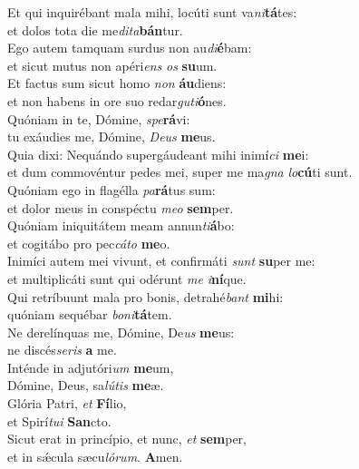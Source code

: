 \oddverse Et qui inquirébant mala mihi, locúti sunt va\textit{ni}\textbf{tá}tes:~\*\\
\oddverse et dolos tota die me\textit{di}\textit{ta}\textbf{bán}tur.\\
\evenverse Ego autem tamquam surdus non au\textit{di}\textbf{é}bam:~\*\\
\evenverse et sicut mutus non apéri\textit{ens} \textit{os} \textbf{su}um.\\
\oddverse Et factus sum sicut homo \textit{non} \textbf{áu}diens:~\*\\
\oddverse et non habens in ore suo redar\textit{gu}\textit{ti}\textbf{ó}nes.\\
\evenverse Quóniam in te, Dómine, \textit{spe}\textbf{rá}vi:~\*\\
\evenverse tu exáudies me, Dómine, \textit{De}\textit{us} \textbf{me}us.\\
\oddverse Quia dixi: Nequándo supergáudeant mihi inimí\textit{ci} \textbf{me}i:~\*\\
\oddverse et dum commovéntur pedes mei, super me ma\textit{gna} \textit{lo}\textbf{cú}ti sunt.\\
\evenverse Quóniam ego in flagélla \textit{pa}\textbf{rá}tus sum:~\*\\
\evenverse et dolor meus in conspéctu \textit{me}\textit{o} \textbf{sem}per.\\
\oddverse Quóniam iniquitátem meam annun\textit{ti}\textbf{á}bo:~\*\\
\oddverse et cogitábo pro pec\textit{cá}\textit{to} \textbf{me}o.\\
\evenverse Inimíci autem mei vivunt, et confirmáti \textit{sunt} \textbf{su}per me:~\*\\
\evenverse et multiplicáti sunt qui odérunt \textit{me} \textit{i}\textbf{ní}que.\\
\oddverse Qui retríbuunt mala pro bonis, detrahé\textit{bant} \textbf{mi}hi:~\*\\
\oddverse quóniam sequébar \textit{bo}\textit{ni}\textbf{tá}tem.\\
\evenverse Ne derelínquas me, Dómine, De\textit{us} \textbf{me}us:~\*\\
\evenverse ne discés\textit{se}\textit{ris} \textbf{a} me.\\
\oddverse Inténde in adjutóri\textit{um} \textbf{me}um,~\*\\
\oddverse Dómine, Deus, sa\textit{lú}\textit{tis} \textbf{me}æ.\\
\evenverse Glória Patri, \textit{et} \textbf{Fí}lio,~\*\\
\evenverse et Spirí\textit{tu}\textit{i} \textbf{San}cto.\\
\oddverse Sicut erat in princípio, et nunc, \textit{et} \textbf{sem}per,~\*\\
\oddverse et in sǽcula sæcu\textit{ló}\textit{rum}. \textbf{A}men.\\
